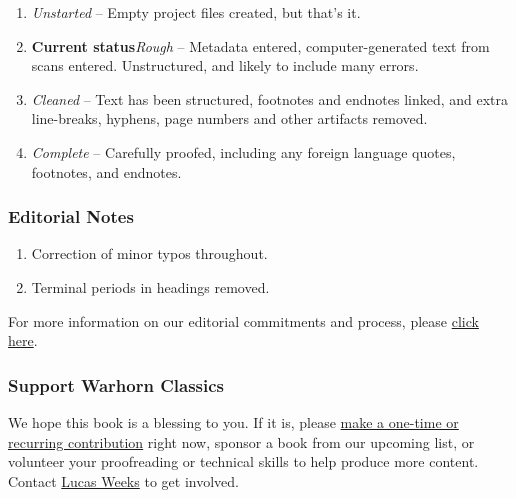 \documentclass[
]{book}
\providecommand{\tightlist}{%
  \setlength{\itemsep}{0pt}\setlength{\parskip}{0pt}}
\begin{document}
\begin{enumerate}
\def\labelenumi{\arabic{enumi}.}
\setcounter{enumi}{-1}
\tightlist
\item
  \emph{Unstarted} -- Empty project files created, but that's it.
\item
  \textbf{Current status}\emph{Rough} -- Metadata entered, computer-generated text from scans entered. Unstructured, and likely to include many errors.
\item
  \emph{Cleaned} -- Text has been structured, footnotes and endnotes linked, and extra line-breaks, hyphens, page numbers and other artifacts removed.
\item
  \emph{Complete} -- Carefully proofed, including any foreign language quotes, footnotes, and endnotes.
\end{enumerate}

\hypertarget{editorial-notes}{%
\subsubsection*{Editorial Notes}\label{editorial-notes}}

\begin{enumerate}
\def\labelenumi{\arabic{enumi}.}
\tightlist
\item
  Correction of minor typos throughout.
\item
  Terminal periods in headings removed.
\end{enumerate}

For more information on our editorial commitments and process, please \href{https://classics.warhornmedia.com/editorial}{click here}.

\hypertarget{support-warhorn-classics}{%
\subsubsection*{Support Warhorn Classics}\label{support-warhorn-classics}}

We hope this book is a blessing to you. If it is, please \href{https://warhornmedia.com/give}{make a one-time or recurring contribution} right now, sponsor a book from our upcoming list, or volunteer your proofreading or technical skills to help produce more content. Contact \href{mailto:lucas@beggarsborn.com}{Lucas Weeks} to get involved.

\clearpage
\setcounter{page}{1}
\end{document}

